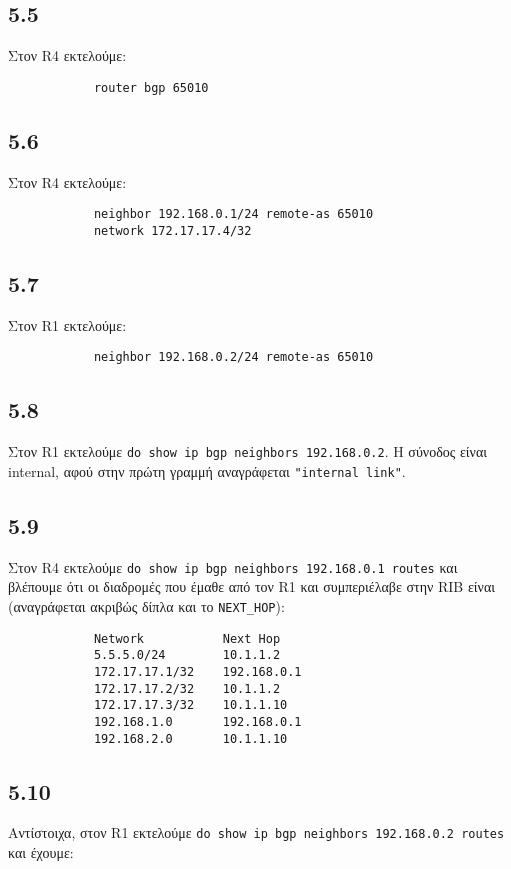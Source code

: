 \documentclass[a4paper, 12pt]{article}
\begin{document}
	\subsection*{5.5}
		Στον R4 εκτελούμε:
		
		\begin{verbatim}
			router bgp 65010
		\end{verbatim}

	\subsection*{5.6}
		Στον R4 εκτελούμε:
		
		\begin{verbatim}
			neighbor 192.168.0.1/24 remote-as 65010
			network 172.17.17.4/32
		\end{verbatim}

	\subsection*{5.7}
		Στον R1 εκτελούμε:
		
		\begin{verbatim}
			neighbor 192.168.0.2/24 remote-as 65010
		\end{verbatim}

	\subsection*{5.8}
		Στον R1 εκτελούμε \verb|do show ip bgp neighbors 192.168.0.2|. Η σύνοδος είναι internal, αφού στην πρώτη γραμμή αναγράφεται \verb|"internal link"|. 

	\subsection*{5.9}
		Στον R4 εκτελούμε \verb|do show ip bgp neighbors 192.168.0.1 routes| και βλέπουμε ότι οι διαδρομές που έμαθε από τον R1 και συμπεριέλαβε στην RIB είναι (αναγράφεται ακριβώς δίπλα και το \verb|NEXT_HOP|):
		
		\begin{verbatim}
			Network           Next Hop
			5.5.5.0/24        10.1.1.2
			172.17.17.1/32    192.168.0.1
			172.17.17.2/32    10.1.1.2
			172.17.17.3/32    10.1.1.10
			192.168.1.0       192.168.0.1
			192.168.2.0       10.1.1.10
		\end{verbatim}

	\subsection*{5.10}
		Αντίστοιχα, στον R1 εκτελούμε \verb|do show ip bgp neighbors 192.168.0.2 routes| και έχουμε:
		
\end{document}
